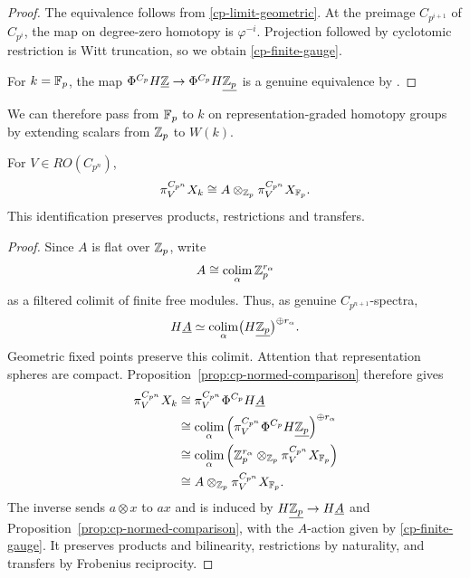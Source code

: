 \begin{proof}
The equivalence follows from \eqref{cp-limit-geometric}. At the preimage
$C_{p^{i+1}}$ of $C_{p^i}$, the map on degree-zero homotopy is
$\varphi^{-i}$. Projection followed by cyclotomic
restriction is Witt truncation, so we obtain
\eqref{cp-finite-gauge}.

For $k=\mathbb F_p$, the map
$\Phi^{C_p}H\underline{\mathbb Z}\to\Phi^{C_p}H\underline{\mathbb Z_p}$
is a genuine equivalence by \cite[Section~1, p.~3]{ZhangHZ}.
\end{proof}

We can therefore pass from $\mathbb F_p$ to $k$ on representation-graded
homotopy groups by extending scalars from $\mathbb Z_p$ to $W(k)$.

\begin{proposition}\label{prop:cp-flat-extension}
For $V\in RO(C_{p^n})$,
\begin{equation}\label{cp-flat-extension}
 \pi_V^{C_{p^n}}X_k\cong
A\otimes_{\mathbb Z_p}\pi_V^{C_{p^n}}X_{\mathbb F_p}.
\end{equation}
This identification preserves products, restrictions and transfers.
\end{proposition}
\begin{proof}
Since $A$ is flat over $\mathbb Z_p$, write
\[
A\cong\operatorname*{colim}_{\alpha}\mathbb Z_p^{r_\alpha}
\]
as a filtered colimit of finite free modules. Thus, as genuine
$C_{p^{n+1}}$-spectra,
\[
H\underline A\simeq
\operatorname*{colim}_{\alpha}
\bigl(H\underline{\mathbb Z_p}\bigr)^{\oplus r_\alpha}.
\]
Geometric fixed points preserve this colimit. Attention that representation
spheres are compact. Proposition~\ref{prop:cp-normed-comparison}
therefore gives
\[
\begin{aligned}
\pi_V^{C_{p^n}}X_k
&\cong
\pi_V^{C_{p^n}}\Phi^{C_p}H\underline A\\
&\cong
\operatorname*{colim}_{\alpha}
\left(
\pi_V^{C_{p^n}}\Phi^{C_p}H\underline{\mathbb Z_p}
\right)^{\oplus r_\alpha}\\
&\cong
\operatorname*{colim}_{\alpha}
\left(
\mathbb Z_p^{r_\alpha}\otimes_{\mathbb Z_p}
\pi_V^{C_{p^n}}X_{\mathbb F_p}
\right)\\
&\cong
A\otimes_{\mathbb Z_p}\pi_V^{C_{p^n}}X_{\mathbb F_p}.
\end{aligned}
\]
The inverse sends $a\otimes x$ to $ax$ and is induced by
$H\underline{\mathbb Z_p}\to H\underline A$ and Proposition~\ref{prop:cp-normed-comparison},
with the $A$-action given by \eqref{cp-finite-gauge}.
It preserves products and bilinearity, restrictions by naturality, and transfers by
Frobenius reciprocity.
\end{proof}

